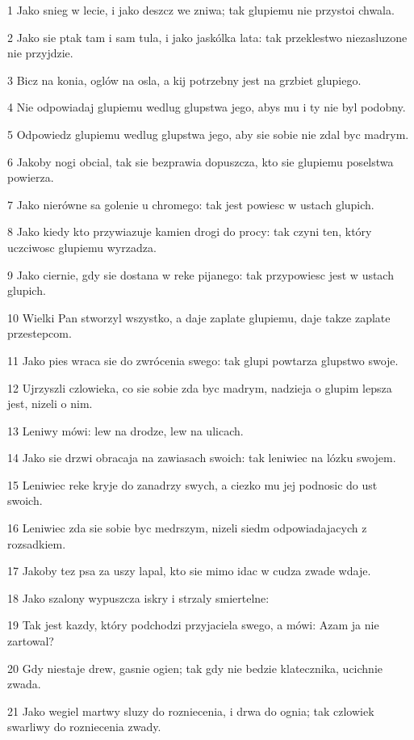 \par 1 Jako snieg w lecie, i jako deszcz we zniwa; tak glupiemu nie przystoi chwala.
\par 2 Jako sie ptak tam i sam tula, i jako jaskólka lata: tak przeklestwo niezasluzone nie przyjdzie.
\par 3 Bicz na konia, oglów na osla, a kij potrzebny jest na grzbiet glupiego.
\par 4 Nie odpowiadaj glupiemu wedlug glupstwa jego, abys mu i ty nie byl podobny.
\par 5 Odpowiedz glupiemu wedlug glupstwa jego, aby sie sobie nie zdal byc madrym.
\par 6 Jakoby nogi obcial, tak sie bezprawia dopuszcza, kto sie glupiemu poselstwa powierza.
\par 7 Jako nierówne sa golenie u chromego: tak jest powiesc w ustach glupich.
\par 8 Jako kiedy kto przywiazuje kamien drogi do procy: tak czyni ten, który uczciwosc glupiemu wyrzadza.
\par 9 Jako ciernie, gdy sie dostana w reke pijanego: tak przypowiesc jest w ustach glupich.
\par 10 Wielki Pan stworzyl wszystko, a daje zaplate glupiemu, daje takze zaplate przestepcom.
\par 11 Jako pies wraca sie do zwrócenia swego: tak glupi powtarza glupstwo swoje.
\par 12 Ujrzyszli czlowieka, co sie sobie zda byc madrym, nadzieja o glupim lepsza jest, nizeli o nim.
\par 13 Leniwy mówi: lew na drodze, lew na ulicach.
\par 14 Jako sie drzwi obracaja na zawiasach swoich: tak leniwiec na lózku swojem.
\par 15 Leniwiec reke kryje do zanadrzy swych, a ciezko mu jej podnosic do ust swoich.
\par 16 Leniwiec zda sie sobie byc medrszym, nizeli siedm odpowiadajacych z rozsadkiem.
\par 17 Jakoby tez psa za uszy lapal, kto sie mimo idac w cudza zwade wdaje.
\par 18 Jako szalony wypuszcza iskry i strzaly smiertelne:
\par 19 Tak jest kazdy, który podchodzi przyjaciela swego, a mówi: Azam ja nie zartowal?
\par 20 Gdy niestaje drew, gasnie ogien; tak gdy nie bedzie klatecznika, ucichnie zwada.
\par 21 Jako wegiel martwy sluzy do rozniecenia, i drwa do ognia; tak czlowiek swarliwy do rozniecenia zwady.
